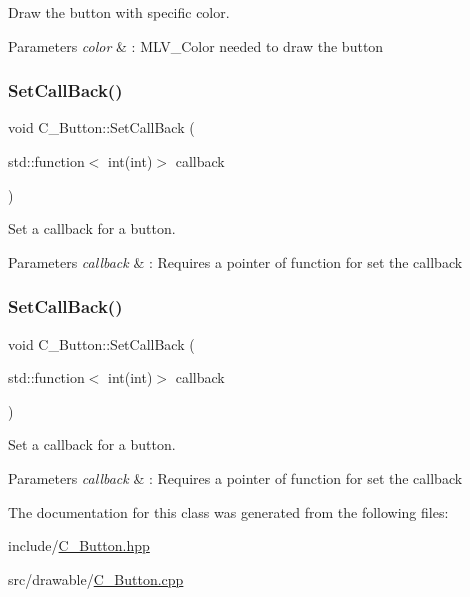 Draw the button with specific color. 


\begin{DoxyParams}{Parameters}
{\em color} & \+: M\+L\+V\+\_\+\+Color needed to draw the button \\
\hline
\end{DoxyParams}
\mbox{\label{classC__Button_aedb01f3229d8176f6a9475cf2edae8f0}} 
\subsubsection{\texorpdfstring{Set\+Call\+Back()}{SetCallBack()}\hspace{0.1cm}{\footnotesize\ttfamily [1/2]}}
{\footnotesize\ttfamily void C\+\_\+\+Button\+::\+Set\+Call\+Back (\begin{DoxyParamCaption}\item[{std\+::function$<$ int(int)$>$}]{callback }\end{DoxyParamCaption})}



Set a callback for a button. 


\begin{DoxyParams}{Parameters}
{\em callback} & \+: Requires a pointer of function for set the callback \\
\hline
\end{DoxyParams}
\mbox{\label{classC__Button_aedb01f3229d8176f6a9475cf2edae8f0}} 
\subsubsection{\texorpdfstring{Set\+Call\+Back()}{SetCallBack()}\hspace{0.1cm}{\footnotesize\ttfamily [2/2]}}
{\footnotesize\ttfamily void C\+\_\+\+Button\+::\+Set\+Call\+Back (\begin{DoxyParamCaption}\item[{std\+::function$<$ int(int)$>$}]{callback }\end{DoxyParamCaption})}



Set a callback for a button. 


\begin{DoxyParams}{Parameters}
{\em callback} & \+: Requires a pointer of function for set the callback \\
\hline
\end{DoxyParams}


The documentation for this class was generated from the following files\+:\begin{DoxyCompactItemize}
\item 
include/\hyperlink{C__Button_8hpp}{C\+\_\+\+Button.\+hpp}\item 
src/drawable/\hyperlink{C__Button_8cpp}{C\+\_\+\+Button.\+cpp}\end{DoxyCompactItemize}
